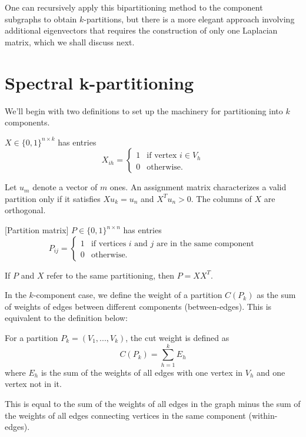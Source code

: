 One can recursively apply this bipartitioning method to the component
subgraphs to obtain $k$-partitions, but there is a more elegant
approach involving additional eigenvectors that requires the
construction of only one Laplacian matrix, which we shall discuss next.

\section{Spectral k-partitioning}

We'll begin with two definitions to set up the machinery for
partitioning into $k$ components.

\begin{definition}
 $X \in \{0, 1\}^{n \times k}$ has entries
\[ X_{ih} = \begin{cases}
		1 & \mbox{if vertex } i \in V_h \\
		0 & \mbox{otherwise.}
\end{cases} \]
\end{definition}

Let $u_m$ denote a vector of $m$ ones.
An assignment matrix characterizes a valid partition only if it
satisfies $X u_k = u_n$ and $X^T u_n > 0$.
The columns of $X$ are orthogonal.

\begin{definition} \label{partition_matrix}
[Partition matrix] $P \in \{0, 1\}^{n \times n}$ has entries
\[ P_{ij} = \begin{cases}
		1 & \mbox{if vertices } i \mbox{ and } j
		    \mbox{ are in the same component} \\
		0 & \mbox{otherwise.}
\end{cases} \]
\end{definition}

If $P$ and $X$ refer to the same partitioning, then $P = X X^T$.

In the $k$-component case, we define the weight of a partition
$C(P_k)$ as the sum of weights of edges between different components
(between-edges). This is equivalent to the definition below:

\begin{definition}
 For a partition $P_k = (V_1, ..., V_k)$, the cut weight
is defined as
\[ C(P_k) = \sum_{h=1}^k E_h \]
where $E_h$ is the sum of the weights of all edges with one vertex in
$V_h$ and one vertex not in it.
\end{definition}

This is equal to the sum of the weights of all edges in the graph minus
the sum of the weights of all edges connecting vertices in the same
component (within-edges).


